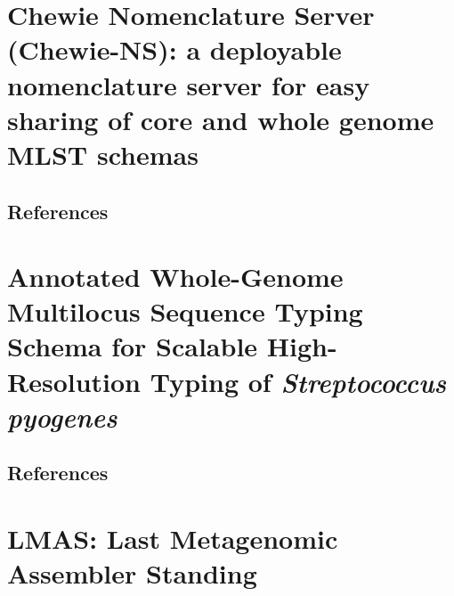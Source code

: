 \documentclass[12pt,a4paper,twoside,openright]{book}
\begin{document}
\begin{sloppy}
\newpage
\thispagestyle{empty}
\chapter{Chewie Nomenclature Server (Chewie-NS): a deployable nomenclature server for easy sharing of core and whole genome MLST schemas\label{ch:paper2}}

\thispagestyle{empty}
\clearpage \thispagestyle{empty}\mbox{}\clearpage
\newpage
\begin{refsection}

\newpage
\section{References}
\printbibliography[heading=none]
\end{refsection}

\newpage
\thispagestyle{empty}
\chapter{Annotated Whole-Genome Multilocus Sequence Typing Schema for Scalable High-Resolution Typing of \textit{Streptococcus pyogenes}\label{ch:paper3}}

\thispagestyle{empty}
\clearpage \thispagestyle{empty}\mbox{}\clearpage
\newpage
\begin{refsection}

\newpage
\section{References}
\printbibliography[heading=none]
\end{refsection}

\newpage
\thispagestyle{empty}
\chapter{LMAS: Last Metagenomic Assembler Standing\label{ch:paper4}}

\thispagestyle{empty}
\clearpage \thispagestyle{empty}\mbox{}\clearpage
\newpage
\begin{refsection}

\newpage

\end{refsection}
\end{sloppy}
\end{document}
